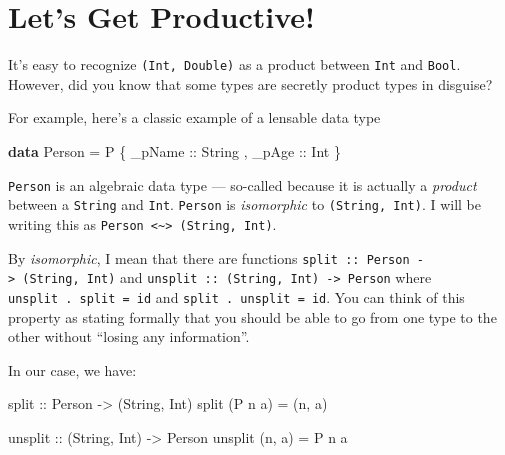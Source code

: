 \documentclass[]{article}
\newenvironment{Shaded}{}{}
\newcommand{\DataTypeTok}[1]{\textcolor[rgb]{0.56,0.13,0.00}{#1}}
\newcommand{\FunctionTok}[1]{\textcolor[rgb]{0.02,0.16,0.49}{#1}}
\newcommand{\KeywordTok}[1]{\textcolor[rgb]{0.00,0.44,0.13}{\textbf{#1}}}
\newcommand{\NormalTok}[1]{#1}
\newcommand{\OtherTok}[1]{\textcolor[rgb]{0.00,0.44,0.13}{#1}}
\begin{document}
\hypertarget{lets-get-productive}{%
\section{Let's Get Productive!}\label{lets-get-productive}}

It's easy to recognize \texttt{(Int,\ Double)} as a product between \texttt{Int}
and \texttt{Bool}. However, did you know that some types are secretly product
types in disguise?

For example, here's a classic example of a lensable data type

\begin{Shaded}
\begin{Highlighting}[]
\KeywordTok{data} \DataTypeTok{Person} \FunctionTok{=} \DataTypeTok{P}\NormalTok{ \{}\OtherTok{ _pName ::} \DataTypeTok{String}
\NormalTok{                ,}\OtherTok{ _pAge  ::} \DataTypeTok{Int}
\NormalTok{                \}}
\end{Highlighting}
\end{Shaded}

\texttt{Person} is an algebraic data type --- so-called because it is actually a
\emph{product} between a \texttt{String} and \texttt{Int}. \texttt{Person} is
\emph{isomorphic} to \texttt{(String,\ Int)}. I will be writing this as
\texttt{Person\ \textless{}\textasciitilde{}\textgreater{}\ (String,\ Int)}.

By \emph{isomorphic}, I mean that there are functions
\texttt{split\ ::\ Person\ -\textgreater{}\ (String,\ Int)} and
\texttt{unsplit\ ::\ (String,\ Int)\ -\textgreater{}\ Person} where
\texttt{unsplit\ .\ split\ =\ id} and \texttt{split\ .\ unsplit\ =\ id}. You can
think of this property as stating formally that you should be able to go from
one type to the other without ``losing any information''.

In our case, we have:

\begin{Shaded}
\begin{Highlighting}[]
\OtherTok{split ::} \DataTypeTok{Person} \OtherTok{->}\NormalTok{ (}\DataTypeTok{String}\NormalTok{, }\DataTypeTok{Int}\NormalTok{)}
\NormalTok{split (}\DataTypeTok{P}\NormalTok{ n a) }\FunctionTok{=}\NormalTok{ (n, a)}

\OtherTok{unsplit ::}\NormalTok{ (}\DataTypeTok{String}\NormalTok{, }\DataTypeTok{Int}\NormalTok{) }\OtherTok{->} \DataTypeTok{Person}
\NormalTok{unsplit (n, a) }\FunctionTok{=} \DataTypeTok{P}\NormalTok{ n a}
\end{Highlighting}
\end{Shaded}
\end{document}
